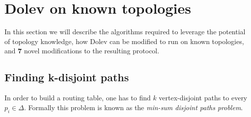 




\section{Dolev on known topologies}
\label{contr-dolev}
In this section we will describe the algorithms required to leverage the potential of topology knowledge, how Dolev can be modified to run on known topologies, and \textbf{7} novel modifications to the resulting protocol.

\subsection{Finding k-disjoint paths}
In order to build a routing table, one has to find $k$ vertex-disjoint paths to every $p_i \in \Delta$. Formally this problem is known as the \textit{min-sum disjoint paths problem}.

